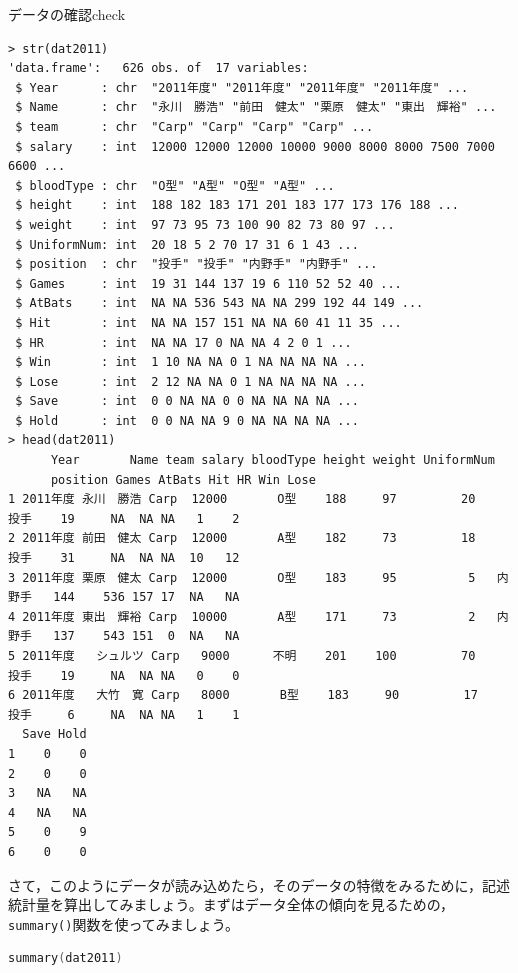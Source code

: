 \documentclass{ltjsbook}
\begin{document}
\begin{Rscreen}{データの確認}{check}
\begin{verbatim}
> str(dat2011)
'data.frame':	626 obs. of  17 variables:
 $ Year      : chr  "2011年度" "2011年度" "2011年度" "2011年度" ...
 $ Name      : chr  "永川　勝浩" "前田　健太" "栗原　健太" "東出　輝裕" ...
 $ team      : chr  "Carp" "Carp" "Carp" "Carp" ...
 $ salary    : int  12000 12000 12000 10000 9000 8000 8000 7500 7000 6600 ...
 $ bloodType : chr  "O型" "A型" "O型" "A型" ...
 $ height    : int  188 182 183 171 201 183 177 173 176 188 ...
 $ weight    : int  97 73 95 73 100 90 82 73 80 97 ...
 $ UniformNum: int  20 18 5 2 70 17 31 6 1 43 ...
 $ position  : chr  "投手" "投手" "内野手" "内野手" ...
 $ Games     : int  19 31 144 137 19 6 110 52 52 40 ...
 $ AtBats    : int  NA NA 536 543 NA NA 299 192 44 149 ...
 $ Hit       : int  NA NA 157 151 NA NA 60 41 11 35 ...
 $ HR        : int  NA NA 17 0 NA NA 4 2 0 1 ...
 $ Win       : int  1 10 NA NA 0 1 NA NA NA NA ...
 $ Lose      : int  2 12 NA NA 0 1 NA NA NA NA ...
 $ Save      : int  0 0 NA NA 0 0 NA NA NA NA ...
 $ Hold      : int  0 0 NA NA 9 0 NA NA NA NA ...
> head(dat2011)
      Year       Name team salary bloodType height weight UniformNum
      position Games AtBats Hit HR Win Lose
1 2011年度 永川　勝浩 Carp  12000       O型    188     97         20     投手    19     NA  NA NA   1    2
2 2011年度 前田　健太 Carp  12000       A型    182     73         18     投手    31     NA  NA NA  10   12
3 2011年度 栗原　健太 Carp  12000       O型    183     95          5   内野手   144    536 157 17  NA   NA
4 2011年度 東出　輝裕 Carp  10000       A型    171     73          2   内野手   137    543 151  0  NA   NA
5 2011年度   シュルツ Carp   9000      不明    201    100         70     投手    19     NA  NA NA   0    0
6 2011年度   大竹　寛 Carp   8000       B型    183     90         17     投手     6     NA  NA NA   1    1
  Save Hold
1    0    0
2    0    0
3   NA   NA
4   NA   NA
5    0    9
6    0    0
\end{verbatim}
\end{Rscreen}

さて，このようにデータが読み込めたら，そのデータの特徴をみるために，記述統計量を算出してみましょう。まずはデータ全体の傾向を見るための，\verb|summary()|関数を使ってみましょう。

\begin{lstlisting}[language=c++,label={code:5_03},caption={記述統計量の算出}]
summary(dat2011)
\end{lstlisting}
\end{document}
